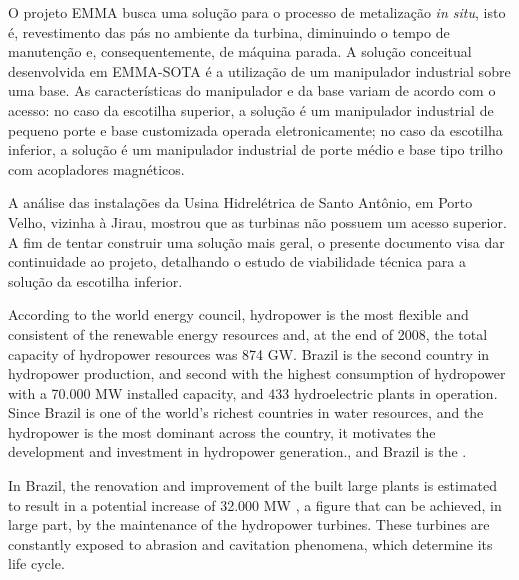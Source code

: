 O projeto EMMA busca uma solução para o processo de metalização \textit{in
situ}, isto é, revestimento das pás no ambiente da turbina, diminuindo o tempo
de manutenção e, consequentemente, de máquina parada.  A solução conceitual
desenvolvida em EMMA-SOTA é a utilização de um manipulador industrial sobre uma
base. As características do manipulador e da base variam de acordo com o
acesso: no caso da escotilha superior, a solução é um manipulador industrial de
pequeno porte e base customizada operada eletronicamente; no caso da escotilha
inferior, a solução é um manipulador industrial de porte médio e base tipo
trilho com acopladores magnéticos.

A análise das instalações da Usina Hidrelétrica de Santo Antônio, em Porto
Velho, vizinha à Jirau, mostrou que as turbinas não possuem um acesso superior.
A fim de tentar construir uma solução mais geral, o presente documento visa dar
continuidade ao projeto, detalhando o estudo de viabilidade técnica para a
solução da escotilha inferior.

According to the world energy council, hydropower is the most flexible and
consistent of the renewable energy resources and, at the end of 2008, the total
capacity of hydropower resources was 874 GW. Brazil is the second
country in hydropower production, and second with the highest
consumption of hydropower with a 70.000 MW installed capacity, and 433
hydroelectric plants in operation. Since Brazil is one of the world's richest
countries in water resources, and the hydropower is the most dominant across
the country, it motivates the development and investment in hydropower
generation., and Brazil is the .


In Brazil, the renovation and improvement of the built large plants is estimated
to result in a potential increase of 32.000 MW \citep{goldemberg2007energia}, a
figure that can be achieved, in large part, by the maintenance of the
hydropower turbines. These turbines are constantly exposed to abrasion and
cavitation phenomena, which determine its life cycle.

